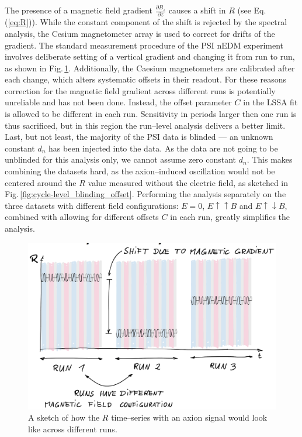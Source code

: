 The presence of a magnetic field gradient $\frac{\partial B_z}{\partial z}$ causes a shift in $R$ (see Eq.\,(\ref{eq:R})). While the constant component of the shift is rejected by the spectral analysis, the Cesium magnetometer array  is used to correct for drifts of the gradient. The standard measurement procedure of the PSI nEDM experiment involves deliberate setting of a vertical gradient and changing it from run to run, as shown in Fig.\,\ref{fig:cycle-level_gradient_jump}. Additionally, the Caesium magnetometers are calibrated after each change, which alters systematic offsets in their readout. For these reasons correction for the magnetic field gradient across different runs is potentially unreliable and has not been done. Instead, the offset parameter $C$ in the LSSA fit is allowed to be different in each run. Sensitivity in periods larger then one run is thus sacrificed, but in this region the run--level analysis delivers a better limit. Last, but not least, the majority of the PSI data is blinded  --- an unknown constant $d_n$ has been injected into the data. As the data are not going to be unblinded for this analysis only, we cannot assume zero constant $d_n$. This makes combining the datasets hard, as the axion--induced oscillation would not be centered around the $R$ value measured without the electric field, as sketched in Fig.\,\ref{fig:cycle-level_blinding_offset}. Performing the analysis separately on the three datasets with different field configurations: $E=0$, $E \uparrow \uparrow B$ and $E \uparrow \downarrow B$, combined with allowing for different offsets $C$ in each run, greatly simplifies the analysis.

\begin{figure}[htb]
  \centering \includegraphics[width=\linewidth]{gfx/axions/cycle-level_gradient_jump.png}
  \caption{A sketch of how the $R$ time--series with an axion signal would look like across different runs.}
  \label{fig:cycle-level_gradient_jump}
\end{figure}

